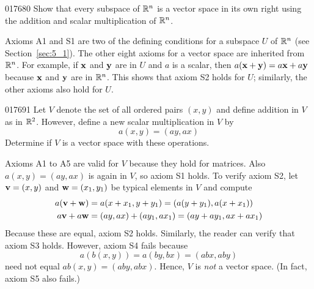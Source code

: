 \begin{example}{}{017680}
Show that every subspace of $\mathbb{R}^n$ is a vector space in its own right using the addition and scalar multiplication of $\mathbb{R}^n$.

\begin{solution}
Axioms A1 and S1 are two of the defining conditions for a subspace $U$ of $\mathbb{R}^n$ (see Section~\ref{sec:5_1}). The other eight axioms for a vector space are inherited from $\mathbb{R}^n$. For example, if $\textbf{x}$ and $\textbf{y}$ are in $U$ and $a$ is a scalar, then $a(\textbf{x} + \textbf{y}) = a\textbf{x} + a\textbf{y}$ because $\textbf{x}$ and $\textbf{y}$ are in $\mathbb{R}^n$. This shows that axiom S2 holds for $U$; similarly, the other axioms also hold for $U$.
\end{solution}
\end{example}

\begin{example}{}{017691}
Let $V$ denote the set of all ordered pairs $(x, y)$ and define addition in $V$ as in $\mathbb{R}^2$. However, define a new scalar multiplication in $V$ by
\begin{equation*}
a(x, y) = (ay, ax)
\end{equation*}
Determine if $V$ is a vector space with these operations.

\begin{solution}
Axioms A1 to A5 are valid for $V$ because they hold for matrices. Also $a(x, y) = (ay, ax)$ is again in $V$, so axiom S1 holds. To verify axiom S2, let $\textbf{v} = (x, y)$ and $\textbf{w} = (x_{1}, y_{1})$ be typical elements in $V$ and compute
\begin{align*}
a(\textbf{v} + \textbf{w}) &= a(x + x_1, y + y_1) = (a(y + y_1), a(x + x_1)) \\
a\textbf{v} + a\textbf{w} &= (ay, ax) + (ay_1, ax_1) = (ay + ay_1, ax + ax_1)
\end{align*}
Because these are equal, axiom S2 holds. Similarly, the reader can verify that axiom S3 holds. However, axiom S4 fails because
\begin{equation*}
a(b(x, y)) = a(by, bx) = (abx, aby)
\end{equation*}
need not equal $ab(x, y) = (aby, abx)$. Hence, $V$ is \textit{not} a vector space. (In fact, axiom S5 also fails.)
\end{solution}
\end{example}


